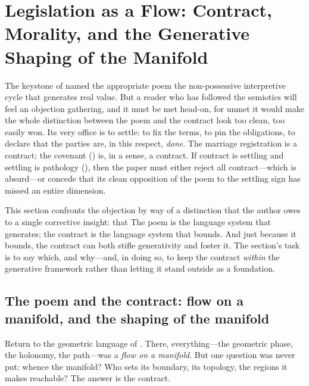 \section{Legislation as a Flow: Contract, Morality, and the Generative Shaping of the Manifold}
\label{p09:sec:contract}

\noindent
The keystone of  named the appropriate poem the non-possessive interpretive cycle that generates real value. But a reader who has followed the semiotics will feel an objection gathering, and it must be met head-on, for unmet it would make the whole distinction between the poem and the contract look too clean, too easily won.  Its very office is to settle: to fix the terms, to pin the obligations, to declare that the parties are, in this respect, \emph{done}. The marriage registration is a contract; the covenant () is, in a sense, a contract. If contract is settling and settling is pathology (), then the paper must either reject all contract---which is absurd---or concede that its clean opposition of the poem to the settling sign has missed an entire dimension.

This section confronts the objection by way of a distinction that the author owes to a single corrective insight: that  The poem is the language system that generates; the contract is the language system that bounds. And just because it bounds, the contract can both stifle generativity and foster it. The section's task is to say which, and why---and, in doing so, to keep the contract \emph{within} the generative framework rather than letting it stand outside as a foundation.

\subsection{The poem and the contract: flow on a manifold, and the shaping of the manifold}
\label{p09:sec:flow-manifold}

Return to the geometric language of . There, everything---the geometric phase, the holonomy, the path---was a \emph{flow on a manifold}. But one question was never put: whence the manifold? Who sets its boundary, its topology, the regions it makes reachable? The answer is the contract.

